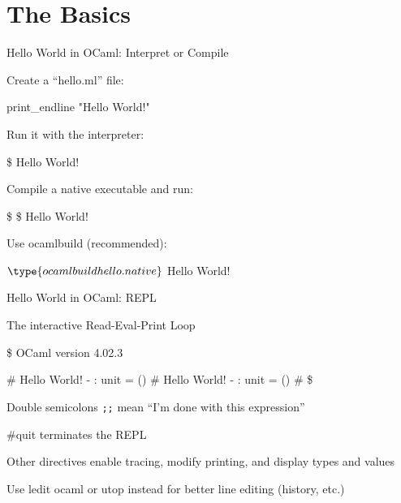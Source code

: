 \documentclass{plt}
\begin{document}
\part{The Basics}
\frame{\partpage}

\begin{frame}[fragile]{Hello World in OCaml: Interpret or Compile}

Create a ``hello.ml'' file:

\begin{ocaml}
print_endline "Hello World!"
\end{ocaml}

Run it with the interpreter:

\begin{interactive}
\$ 
Hello World!
\end{interactive}
%
Compile a native executable and run:

\begin{interactive}
\$ 
\$ 
Hello World!
\end{interactive}
%
Use ocamlbuild (recommended):

\begin{interactive}
$ \type{ocamlbuild hello.native}
$ 
Hello World!
\end{interactive}

\end{frame}

\begin{frame}[fragile]{Hello World in OCaml: REPL}

  The interactive Read-Eval-Print Loop

\begin{interactive}
\$ 
        OCaml version 4.02.3

# 
Hello World!
- : unit = ()
# 
Hello World!
- : unit = ()
# 
\$
\end{interactive}
%
Double semicolons \verb|;;| mean ``I'm done with this expression''

\#quit terminates the REPL

Other directives enable tracing, modify printing, and display types
and values

Use \alert{ledit ocaml} or \alert{utop} instead for better line
editing (history, etc.)

\end{frame}
\end{document}
